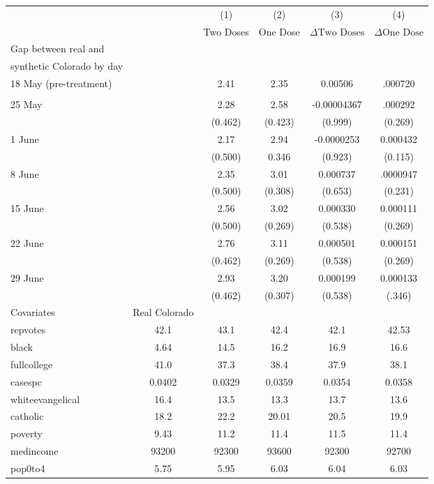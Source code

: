 \begin{minipage}{7in}
	\centering
	\def\sym#1{\ifmmode^{#1}\else\(^{#1}\)\fi}
	\def\arraystretch{1}
	\small
	\begin{tabular*}{\textwidth}{@{\extracolsep{\fill}}l*{5}{c}}
		\hline\hline
		&&\multicolumn{1}{c}{(1)}&\multicolumn{1}{c}{(2)}&\multicolumn{1}{c}{(3)}&\multicolumn{1}{c}{(4)}\\
		&&\multicolumn{1}{c}{Two Doses}&\multicolumn{1}{c}{One Dose}&\multicolumn{1}{c}{$\Delta \textrm{Two Doses}$}&\multicolumn{1}{c}{$\Delta \textrm{One Dose}$}\\
		\hline
		Gap between real and\\
		synthetic Colorado by day\\
		\hline
		18 May (pre-treatment)&&2.41&2.35&0.00506&.000720\\
		\\
		25 May&&2.28&2.58&-0.00004367&.000292\\
		&&(0.462)&(0.423)&(0.999)&(0.269)\\
		1 June&&2.17&2.94&-0.0000253&0.000432\\
		&&(0.500)&0.346&(0.923)&(0.115)\\
		8 June&&2.35&3.01&0.000737&.0000947\\
		&&(0.500)&(0.308)&(0.653)&(0.231)\\
		15 June&&2.56&3.02&0.000330&0.000111\\
		&&(0.500)&(0.269)&(0.538)&(0.269)\\
		22 June&&2.76&3.11&0.000501&0.000151\\
		&&(0.462)&(0.269)&(0.538)&(0.269)\\
		29 June&&2.93&3.20&0.000199&0.000133\\
		&&(0.462)&(0.307)&(0.538)&(.346)\\
		\hline
		Covariates&Real Colorado\\
		\hline
		repvotes&42.1&43.1&42.4&42.1&42.53\\
		black&4.64&14.5&16.2&16.9&16.6\\
		fullcollege&41.0&37.3&38.4&37.9&38.1\\
		casespc&0.0402&0.0329&0.0359&0.0354&0.0358\\
		whiteevangelical&16.4&13.5&13.3&13.7&13.6\\
		catholic&18.2&22.2&20.01&20.5&19.9\\
		poverty&9.43&11.2&11.4&11.5&11.4\\
		medincome&93200&92300&93600&92300&92700\\
		pop0to4&5.75&5.95&6.03&6.04&6.03\\

\end{tabular*}
\end{minipage}
